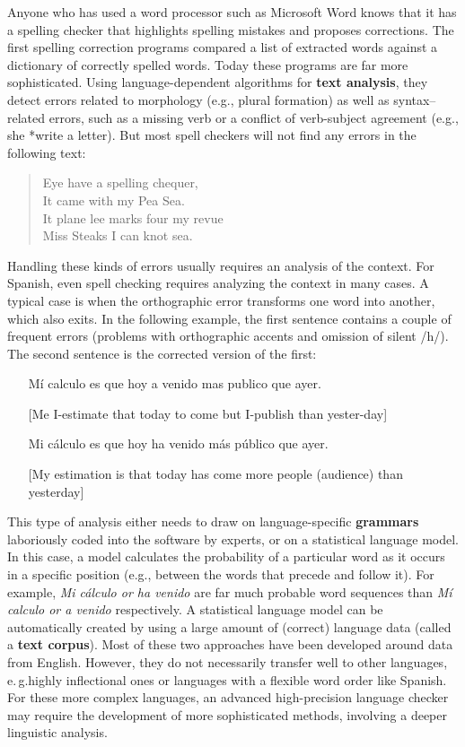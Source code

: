 \begin{multicols}{2}
Anyone who has used a word processor such as Microsoft Word knows that it has a spelling checker that highlights spelling mistakes and proposes corrections. The first spelling correction programs compared a list of extracted words against a dictionary of correctly spelled words. Today these programs are far more sophisticated. Using language-dependent algorithms for \textbf{text analysis}, they detect errors related to morphology (e.g., plural formation) as well as syntax–related errors, such as a missing verb or a conflict of verb-subject agreement (e.g., she *write a letter). But most spell checkers will not find any errors in the following text:

\begin{quote}
  Eye have a spelling chequer,\\
  It came with my Pea Sea.\\
  It plane lee marks four my revue\\
  Miss Steaks I can knot sea.\cite{zar1}
\end{quote}

Handling these kinds of errors usually requires an analysis of the context. For Spanish, even spell checking requires analyzing the context in many cases. A typical case is when the orthographic error transforms one word into another, which also exits. In the following example, the first sentence contains a couple of frequent errors (problems with orthographic accents and omission of silent /h/). The second sentence is the corrected version of the first:

\begin{itemize}
  \item[] Mí calculo es que hoy a venido mas publico que ayer.
  \item[] [Me I-estimate that today to come but I-publish than yester-day]
  \item[] Mi cálculo es que hoy ha venido más público que ayer.
  \item[] [My estimation is that today has come more people (audience) than yesterday]
\end{itemize}

This type of analysis either needs to draw on language-specific \textbf{grammars} laboriously coded into the software by experts, or on a statistical language model. In this case, a model calculates the probability of a particular word as it occurs in a specific position (e.g., between the words that precede and follow it). For example, \textit{Mi cálculo or ha venido} are far much probable word sequences than \textit{Mí calculo or a venido} respectively. A statistical language model can be automatically created by using a large amount of (correct) language data (called a \textbf{text corpus}). Most of these two approaches have been developed around data from English. However, they do not necessarily transfer well to other languages, e.\,g.highly inflectional ones or languages with a flexible word order like Spanish. For these more complex languages, an advanced high-precision language checker may require the development of more sophisticated methods, involving a deeper linguistic analysis. 


\end{multicols}

